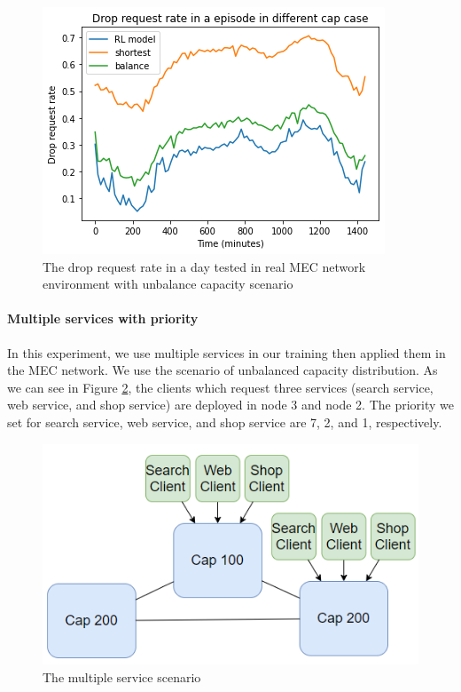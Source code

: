 \documentclass[conference]{IEEEtran}
\begin{document}
\begin{figure}[]
    \centering
    \includegraphics[scale = 0.5]{imgs/unbalance_capacity_results.png}
    \caption{The drop request rate in a day tested in real MEC network environment with unbalance capacity scenario}
    \label{fig:unbalance_capacity_results}
\end{figure}

\paragraph{Multiple services with priority}

In this experiment, we use multiple services in our training then applied them in the MEC network. We use the scenario of unbalanced capacity distribution. As we can see in Figure \ref{fig:multiple_service_scenario}, the clients which request three services (search service, web service, and shop service) are deployed in node 3 and node 2. The priority we set for search service, web service, and shop service are 7, 2, and 1, respectively. 

\begin{figure}[]
    \centering
    \includegraphics[scale = 0.5]{imgs/multiple_service_scenario.png}
    \caption{The multiple service scenario}
    \label{fig:multiple_service_scenario}
\end{figure}
\end{document}
